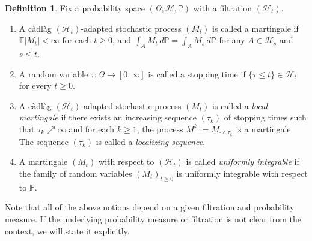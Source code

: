 \documentclass[11pt,a4paper,reqno]{amsart}
\theoremstyle{definition}
\newtheorem{definition}[theorem]{Definition}
\numberwithin{equation}{section}
\begin{document}
\begin{definition} 
Fix a probability space $(\Omega,\mathcal H, \mathbb P)$ with a filtration $(\mathcal H_t)$.
\begin{enumerate}
\item[(i)] A c\`adl\`ag $(\mathcal H_t)$-adapted stochastic process $(M_t)$
is called  a martingale if $\mathbb E |M_t|<\infty$ for each  $t\ge 0$, and $\int_A M_t\,d\mathbb P=\int_A M_s\,d\mathbb P$
for any $A\in\mathcal H_s$ and $s\le t$.
\item[(ii)] A random variable $\tau:\Omega\to [0,\infty]$ is called a stopping time if $\{\tau\le t\}\in \mathcal H_t$ for every $t\ge 0$.
\item[(iii)] A c\`adl\`ag $(\mathcal H_t)$-adapted stochastic process $(M_t)$
is called  a {\em local martingale} if there exists an increasing sequence $(\tau_k)$ of stopping times such that
$\tau_k\nearrow \infty$ and for each $k\ge 1$, the  process $M^k:=M_{\cdot\wedge\tau_k}$ is a martingale. 
The sequence $(\tau_k)$ is called a {\em localizing sequence}.
\item[(iv)] A martingale  $(M_t)$ with respect to  $(\mathcal H_t)$ is called {\em uniformly integrable}
if the family of random variables $(M_t)_{t\ge 0}$ is uniformly integrable with respect to $\mathbb P$.
\end{enumerate}
\end{definition}

Note that all of the above notions depend on a given filtration and probability measure. 
If the underlying probability measure or filtration is not clear from the context, we will state it explicitly.
\end{document}
